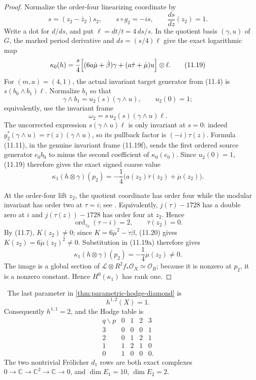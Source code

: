 \begin{proof}
Normalize the order-four linearizing coordinate by
\[
 s=(z_2-\bar z_2)s_2,
 \qquad s\circ g_2=-is,
 \qquad \frac{ds}{dz}(z_2)=1.
\]
Write a dot for $d/ds$, and put
$\ell=dt/t=4\,ds/s$.  In the quotient basis $(\gamma,u)$ of $G$, the
marked period derivative and $ds=(s/4)\ell$ give the exact logarithmic map
\[
 \kappa_0(h)=\frac{s}{4}
 \Bigl[(6a\dot\mu+\dot\beta)\gamma
 +(a\dot\tau+\dot\mu)u\Bigr]\otimes\ell.
\tag{11.19}
\]
For $(m,a)=(4,1)$, the actual invariant target generator from (11.4) is
$s(b_0\wedge b_1)\ell$.  Normalize $b_1$ so that
\[
 \gamma\wedge b_1=u_2(s)(\gamma\wedge u),
 \qquad u_2(0)=1;
\]
equivalently, use the invariant frame
\[
 \omega_2=s\,u_2(s)(\gamma\wedge u)\ell.
\tag{11.19f}
\]
The uncorrected expression $s(\gamma\wedge u)\ell$ is only invariant at
$s=0$: indeed $g_2^*(\gamma\wedge u)=\tau(z)(\gamma\wedge u)$, so its
pullback factor is $(-i)\tau(z)$.  Formula (11.11), in the genuine invariant
frame (11.19f), sends the first ordered source generator $e_0b_0$ to
minus the second coefficient of $\kappa_0(e_0)$.  Since $u_2(0)=1$,
(11.19) therefore gives the exact signed coarse value
\[
 \kappa_1(h\otimes\gamma)(p_2)
 =-\frac14\bigl(a(z_2)\dot\tau(z_2)+\dot\mu(z_2)\bigr).
\tag{11.19a}
\]

At the order-four lift $z_2$, the quotient coordinate has order four while
the modular invariant has order two at $\tau=i$; see
\cite[Chapter~VII]{Serre1973}.  Equivalently,
$j(\tau)-1728$ has a double zero at $i$ and
$j(\tau(z))-1728$ has order four at $z_2$.  Hence
\[
 \operatorname{ord}_{z_2}(\tau-i)=2,\qquad \dot\tau(z_2)=0.
\tag{11.20}
\]
By (11.7), $K(z_2)\ne0$; since
$K=6\dot\mu^2-\dot\tau\dot\beta$, (11.20) gives
$K(z_2)=6\dot\mu(z_2)^2\ne0$.  Substitution in (11.19a) therefore gives
\[
 \kappa_1(h\otimes\gamma)(p_2)=-\frac14\dot\mu(z_2)\ne0.
\tag{11.20a}
\]
The image is a global section of
$\mathcal L\otimes R^2f_*\mathcal O_X\simeq\mathcal O_B$; because it is
nonzero at $p_2$, it is a nonzero constant.  Hence
$H^0(\kappa_1)$ has rank one.
\end{proof}

\begin{corollary}
\label{cor:exact-hodge-diamond}
\Verified\ The last parameter in
\cref{thm:parametric-hodge-diamond} is
\[
 h^{1,2}(X)=1.
\]
Consequently $h^{1,1}=2$, and the Hodge table is
\[
\begin{array}{c|cccc}
q\backslash p&0&1&2&3\\ \hline
3&0&0&0&1\\
2&0&1&2&1\\
1&1&2&1&0\\
0&1&0&0&0.
\end{array}
\]
The two nontrivial Fr\"olicher $d_1$ rows are both exact complexes
$0\to\mathbb C\to\mathbb C^2\to\mathbb C\to0$, and
$\dim E_1=10$, $\dim E_2=2$.
\end{corollary}

